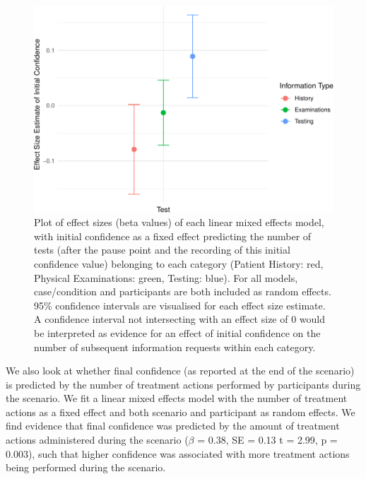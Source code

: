 \documentclass[a4paper, nobind]{templates/ociamthesis}
\begin{document}
\begin{figure}

{\centering \includegraphics[width=1\linewidth]{04-study4_files/figure-latex/finalconfidenceplot-1} 

}

\caption[VR Study: Effect Sizes of Initial Confidence Predicting Subseqeuent Information Seeking]{Plot of effect sizes (beta values) of each linear mixed effects model, with initial confidence as a fixed effect predicting the number of tests (after the pause point and the recording of this initial confidence value) belonging to each category (Patient History: red, Physical Examinations: green, Testing: blue). For all models, case/condition and participants are both included as random effects. 95\% confidence intervals are visualised for each effect size estimate. A confidence interval not intersecting with an effect size of 0 would be interpreted as evidence for an effect of initial confidence on the number of subsequent information requests within each category.}\label{fig:finalconfidenceplot}
\end{figure}

We also look at whether final confidence (as reported at the end of the scenario) is predicted by the number of treatment actions performed by participants during the scenario. We fit a linear mixed effects model with the number of treatment actions as a fixed effect and both scenario and participant as random effects. We find evidence that final confidence was predicted by the amount of treatment actions administered during the scenario (\(\beta\) = 0.38, SE = 0.13 t = 2.99, p = 0.003), such that higher confidence was associated with more treatment actions being performed during the scenario.
\end{document}
